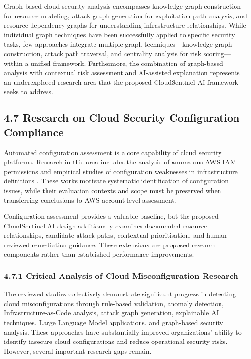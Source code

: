 Graph-based cloud security analysis encompasses knowledge graph construction for resource modeling, attack graph generation for exploitation path analysis, and resource dependency graphs for understanding infrastructure relationships. While individual graph techniques have been successfully applied to specific security tasks, few approaches integrate multiple graph techniques---knowledge graph construction, attack path traversal, and centrality analysis for risk scoring---within a unified framework. Furthermore, the combination of graph-based analysis with contextual risk assessment and AI-assisted explanation represents an underexplored research area that the proposed CloudSentinel AI framework seeks to address.

\subsection{4.7 Research on Cloud Security Configuration Compliance}

Automated configuration assessment is a core capability of cloud security platforms. Research in this area includes the analysis of anomalous AWS IAM permissions \cite{vanede2022iam} and empirical studies of configuration weaknesses in infrastructure definitions \cite{rahman2023k8smisconfig}. These works motivate systematic identification of configuration issues, while their evaluation contexts and scope must be preserved when transferring conclusions to AWS account-level assessment.

Configuration assessment provides a valuable baseline, but the proposed CloudSentinel AI design additionally examines documented resource relationships, candidate attack paths, contextual prioritisation, and human-reviewed remediation guidance. These extensions are proposed research components rather than established performance improvements.

\subsubsection{4.7.1 Critical Analysis of Cloud Misconfiguration Research}

The reviewed studies collectively demonstrate significant progress in detecting cloud misconfigurations through rule-based validation, anomaly detection, Infrastructure-as-Code analysis, attack graph generation, explainable AI techniques, Large Language Model applications, and graph-based security analysis. These approaches have substantially improved organizations' ability to identify insecure cloud configurations and reduce operational security risks. However, several important research gaps remain.

